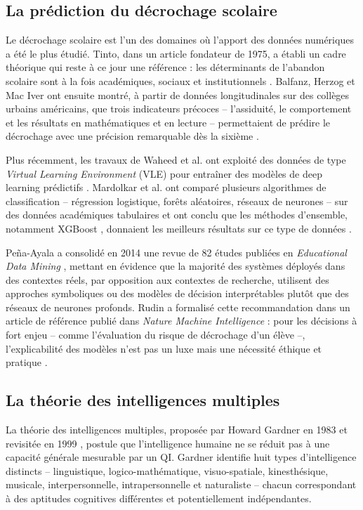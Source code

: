 \documentclass[12pt,a4paper,oneside]{report}
\begin{document}
\subsection{La prédiction du décrochage scolaire}

Le décrochage scolaire est l'un des domaines où l'apport des données numériques a été le plus étudié. Tinto, dans un article fondateur de 1975, a établi un cadre théorique qui reste à ce jour une référence : les déterminants de l'abandon scolaire sont à la fois académiques, sociaux et institutionnels \autocite{tinto1975dropout}. Balfanz, Herzog et Mac Iver ont ensuite montré, à partir de données longitudinales sur des collèges urbains américains, que trois indicateurs précoces -- l'assiduité, le comportement et les résultats en mathématiques et en lecture -- permettaient de prédire le décrochage avec une précision remarquable dès la sixième \autocite{balfanz2007preventing}.

Plus récemment, les travaux de Waheed et al. ont exploité des données de type \textit{Virtual Learning Environment} (VLE) pour entraîner des modèles de deep learning prédictifs \autocite{waheed2020predicting}. Mardolkar et al. ont comparé plusieurs algorithmes de classification -- régression logistique, forêts aléatoires, réseaux de neurones -- sur des données académiques tabulaires et ont conclu que les méthodes d'ensemble, notamment XGBoost \autocite{chen2016xgboost}, donnaient les meilleurs résultats sur ce type de données \autocite{mardolkar2021forecasting}.

Peña-Ayala a consolidé en 2014 une revue de 82 études publiées en \textit{Educational Data Mining} \autocite{penaayla2014educational}, mettant en évidence que la majorité des systèmes déployés dans des contextes réels, par opposition aux contextes de recherche, utilisent des approches symboliques ou des modèles de décision interprétables plutôt que des réseaux de neurones profonds. Rudin a formalisé cette recommandation dans un article de référence publié dans \textit{Nature Machine Intelligence} : pour les décisions à fort enjeu -- comme l'évaluation du risque de décrochage d'un élève --, l'explicabilité des modèles n'est pas un luxe mais une nécessité éthique et pratique \autocite{rudin2019stop}.

\subsection{La théorie des intelligences multiples}

La théorie des intelligences multiples, proposée par Howard Gardner en 1983 \autocite{gardner1983frames} et revisitée en 1999 \autocite{gardner1999intelligence}, postule que l'intelligence humaine ne se réduit pas à une capacité générale mesurable par un QI. Gardner identifie huit types d'intelligence distincts -- linguistique, logico-mathématique, visuo-spatiale, kinesthésique, musicale, interpersonnelle, intrapersonnelle et naturaliste -- chacun correspondant à des aptitudes cognitives différentes et potentiellement indépendantes.
\end{document}
